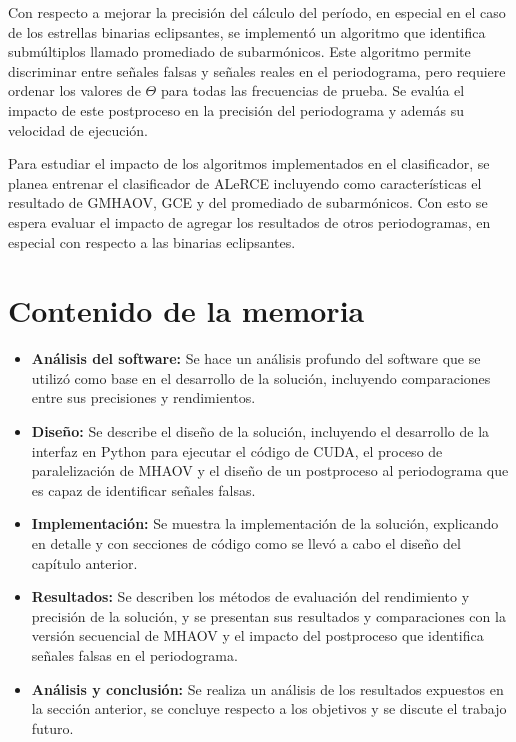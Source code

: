 Con respecto a mejorar la precisión del cálculo del período, en especial en el caso de los estrellas binarias eclipsantes, se implementó un algoritmo que identifica submúltiplos llamado promediado de subarmónicos. Este algoritmo permite discriminar entre señales falsas y señales reales en el periodograma, pero requiere ordenar los valores de $\Theta$ para todas las frecuencias de prueba. Se evalúa el impacto de este postproceso en la precisión del periodograma y además su velocidad de ejecución.

Para estudiar el impacto de los algoritmos implementados en el clasificador, se planea entrenar el clasificador de ALeRCE incluyendo como características el resultado de GMHAOV, GCE y del promediado de subarmónicos. Con esto se espera evaluar el impacto de agregar los resultados de otros periodogramas, en especial con respecto a las binarias eclipsantes.

\section{Contenido de la memoria}\label{chap:contenido}
\begin{itemize}
    \item {\bf Análisis del software:} Se hace un análisis profundo del software que se utilizó como base en el desarrollo de la solución, incluyendo comparaciones entre sus precisiones y rendimientos. 
    \item {\bf Diseño:} Se describe el diseño de la solución, incluyendo el desarrollo de la interfaz en Python para ejecutar el código de CUDA, el proceso de paralelización de MHAOV y el diseño de un postproceso al periodograma que es capaz de identificar señales falsas.
    \item {\bf Implementación:} Se muestra la implementación de la solución, explicando en detalle y con secciones de código como se llevó a cabo el diseño del capítulo anterior.
    \item {\bf Resultados:} Se describen los métodos de evaluación del rendimiento y precisión de la solución, y se presentan sus resultados y comparaciones con la versión secuencial de MHAOV y el impacto del postproceso que identifica señales falsas en el periodograma.
    \item {\bf Análisis y conclusión:} Se realiza un análisis de los resultados expuestos en la sección anterior, se concluye respecto a los objetivos y se discute el trabajo futuro.
\end{itemize}

